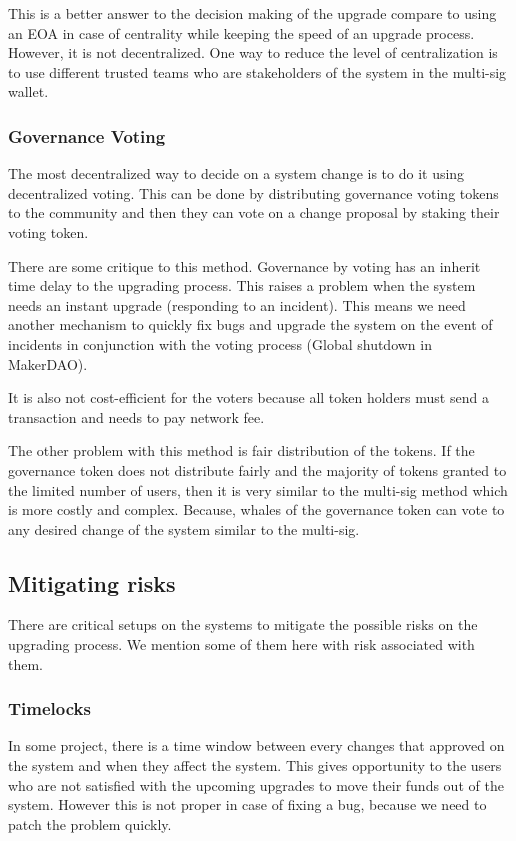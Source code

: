  This is a better answer to the decision making of the upgrade compare to using an EOA in case of centrality while keeping the speed of an upgrade process. However, it is not decentralized. One way to reduce the level of centralization is to use different trusted teams who are stakeholders of the system in the multi-sig wallet. 


\subsubsection{Governance Voting}
The most decentralized way to decide on a system change is to do it using decentralized voting. This can be done by distributing governance voting tokens to the community and then they can vote on a change proposal by staking their voting token. 

There are some critique to this method. Governance by voting has an inherit time delay to the upgrading process. This raises a problem when the system needs an instant upgrade (\eg responding to an incident). This means we need another mechanism to quickly fix bugs and upgrade the system on the event of incidents in conjunction with the voting process (\eg Global shutdown in MakerDAO).

It is also not cost-efficient for the voters because all token holders must send a transaction and needs to pay network fee.

The other problem with this method is fair distribution of the tokens. If the governance token does not distribute fairly and the majority of tokens granted to the limited number of users, then it is very similar to the multi-sig method which is more costly and complex. Because, whales of the governance token can vote to any desired change of the system similar to the multi-sig.
 

\subsection{Mitigating risks}
There are critical setups on the systems to mitigate the possible risks on the upgrading process. We mention some of them here with risk associated with them.

\subsubsection{Timelocks}
In some project, there is a time window between every changes that approved on the system and when they affect the system. This gives opportunity to the users who are not satisfied with the upcoming upgrades to move their funds out of the system. However this is not proper in case of fixing a bug, because we need to patch the problem quickly.

